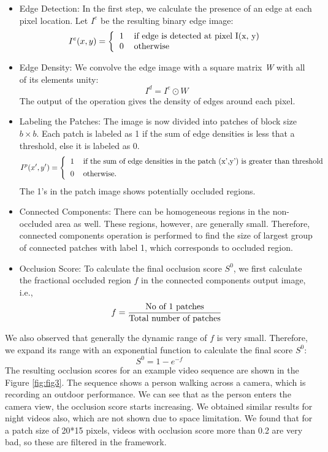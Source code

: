 \documentclass{sig-alternate}
\begin{document}
\begin{itemize}
    \item Edge Detection: In the first step, we calculate the presence of an edge at each pixel location. Let $I^{e}$ be the resulting binary edge image:
    \begin{equation}
        I^{e}(x,y)=\bigg\{\begin{tabular}{cl}1 & if edge is detected at pixel I(x, y)\\0 & otherwise\end{tabular}
    \end{equation}
    \item Edge Density: We convolve the edge image with a square matrix \textit{W} with all of its elements unity:
    \begin{equation}
        I^d=I^e\odot W
    \end{equation}
    The output of the operation gives the density of edges around each pixel.
    \item Labeling the Patches: The image is now divided into patches of block size $b \times b$. Each patch is labeled as 1 if the sum of edge densities is less that a threshold, else it is labeled as 0.
    \begin{equation}
        I^p(x',y')=\Bigg\{\begin{tabular}{cl}1 & if the sum of edge densities in the patch (x',y') is greater than threshold \\ [1ex] 0 & otherwise. \end{tabular}
    \end{equation}
    The 1’s in the patch image shows potentially occluded regions.
    \item Connected Components: There can be homogeneous regions in the non-occluded area as well. These regions, however, are generally small. Therefore, connected components operation is performed to find the size of largest group of connected patches with label 1, which corresponds to occluded region.
    \item Occlusion Score: To calculate the final occlusion score $S^0$, we first calculate the fractional occluded region $f$ in the connected components output image, i.e.,
    \begin{equation}
        f=\frac{\textnormal{No of 1 patches}}{\textnormal{Total number of patches}}
    \end{equation}
\end{itemize}
We also observed that generally the dynamic range of $f$ is very small. Therefore, we expand its range with an exponential function to calculate the final score $S^0$:
\begin{equation}
    S^0=1-e^{-f}
\end{equation}
The resulting occlusion scores for an example video sequence are shown in the Figure \ref{fig:fig3}. The sequence shows a person walking across a camera, which is recording an outdoor performance. We can see that as the person enters the camera view, the occlusion score starts increasing. We obtained similar results for night videos also, which are not shown due to space limitation. We found that for a patch size of 20*15 pixels, videos with occlusion score more than 0.2 are very bad, so these are filtered in the framework.
\end{document}
